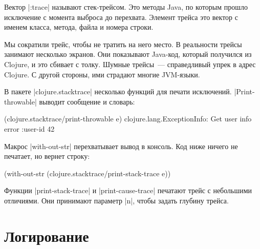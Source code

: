 \begin{english}
\end{english}

Вектор \spverb|:trace| называют стек-трейсом. Это методы Java, по которым прошло
исключение с момента выброса до перехвата. Элемент трейса это вектор с именем
класса, метода, файла и номера строки.

Мы сократили трейс, чтобы не тратить на него место. В реальности трейсы занимают
несколько экранов. Они показывают Java-код, который получился из Clojure, и это
сбивает с толку. Шумные трейсы~--- справедливый упрек в адрес Clojure. С другой
стороны, ими страдают многие JVM-языки.

В пакете \spverb|clojure.stacktrace| несколько функций для печати
исключений. \spverb|Print-throwable| выводит сообщение и словарь:

\begin{english}
  \begin{clojure}
(clojure.stacktrace/print-throwable e)
clojure.lang.ExceptionInfo: Get user info error
{:user-id 42}
  \end{clojure}
\end{english}

Макрос \spverb|with-out-str| перехватывает вывод в консоль. Код ниже ничего не
печатает, но вернет строку:

\begin{english}
  \begin{clojure}
(with-out-str
  (clojure.stacktrace/print-stack-trace e))
  \end{clojure}
\end{english}

Функции \spverb|print-stack-trace| и \spverb|print-cause-trace| печатают трейс с
небольшими отличиями. Они принимают параметр \spverb|n|, чтобы задать глубину
трейса.

\section{Логирование}

